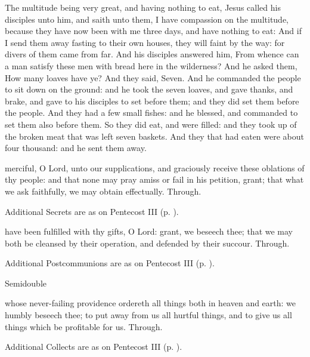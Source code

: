  The multitude being very great, and having nothing to eat, Jesus called his disciples unto him, and saith unto them, I have compassion on the multitude, because they have now been with me three days, and have nothing to eat: And if I send them away fasting to their own houses, they will faint by the way: for divers of them came from far. And his disciples answered him, From whence can a man satisfy these men with bread here in the wilderness? And he asked them, How many loaves have ye? And they said, Seven. And he commanded the people to sit down on the ground: and he took the seven loaves, and gave thanks, and brake, and gave to his disciples to set before them; and they did set them before the people. And they had a few small fishes: and he blessed, and commanded to set them also before them. So they did eat, and were filled: and they took up of the broken meat that was left seven baskets. And they that had eaten were about four thousand: and he sent them away.


\secret
{} merciful, O Lord, unto our supplications, and graciously receive these oblations of thy people: and that none may pray amiss or fail in his petition, grant; that what we ask faithfully, we may obtain effectually. Through.
\begin{rubric}
    Additional Secrets are as on Pentecost III (p. \pageref{PentecostIII}).
\end{rubric}

\postcommunion
{} have been fulfilled with thy gifts, O Lord: grant, we beseech thee; that we may both be cleansed by their operation, and defended by their succour. Through.
\begin{rubric}
    Additional Postcommunions are as on Pentecost III (p. \pageref{PentecostIII}).
\end{rubric}

\begin{inhead}
    {Semidouble}
\end{inhead}

\collect
{} whose never-failing providence ordereth all things both in heaven and earth: we humbly beseech thee; to put away from us all hurtful things, and to give us all things which be profitable for us. Through.
\begin{rubric}
    Additional Collects are as on Pentecost III (p. \pageref{PentecostIII}).
\end{rubric}

